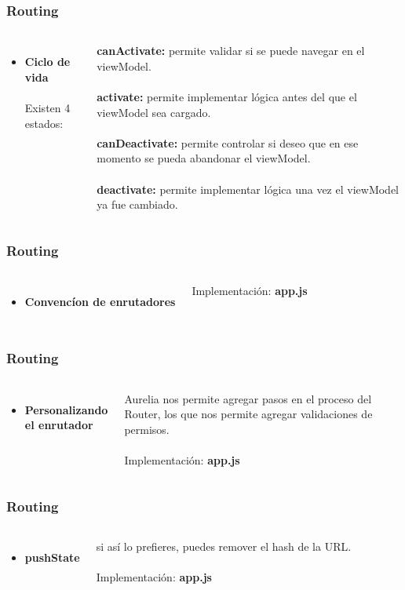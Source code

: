 \documentclass{beamer}
\begin{document}
\begin{frame}
\frametitle{Routing}
\begin{columns}[c]
\begin{itemize}
\item \textbf{Ciclo de vida}
\\~\\
Existen 4 estados:
\end{itemize}
\textbf{canActivate:} permite validar si se puede navegar en el viewModel.
\\~\\
\textbf{activate:} permite implementar l\'ogica antes del que el viewModel sea cargado.
\\~\\
\textbf{canDeactivate:} permite controlar si deseo que en ese momento se pueda abandonar el viewModel.
\\~\\
\textbf{deactivate:} permite implementar l\'ogica una vez el viewModel ya fue cambiado.
\end{columns}
\end{frame}
\begin{frame}
\frametitle{Routing}
\begin{columns}[c]
\begin{itemize}
\item \textbf{Convenc\'ion de enrutadores}
\end{itemize}
Implementaci\'on: \textbf{app.js}
\end{columns}
\end{frame}
\begin{frame}
\frametitle{Routing}
\begin{columns}[c]
\begin{itemize}
\item \textbf{Personalizando el enrutador}
\end{itemize}
Aurelia nos permite agregar pasos en el proceso del Router, los que nos permite agregar validaciones de permisos.
\\~\\
Implementaci\'on: \textbf{app.js}
\end{columns}
\end{frame}
\begin{frame}
\frametitle{Routing}
\begin{columns}[c]
\begin{itemize}
\item \textbf{pushState}
\end{itemize}
si as\'i lo prefieres, puedes remover el hash de la URL.
\\~\\
Implementaci\'on: \textbf{app.js}
\end{columns}
\end{frame}
\end{document}
